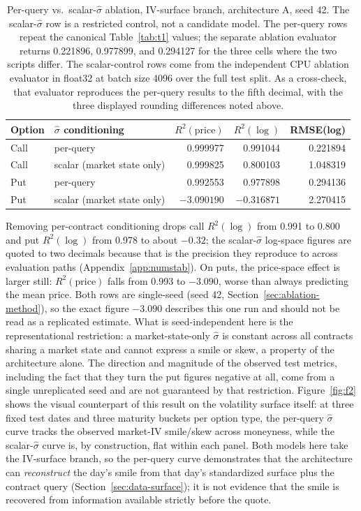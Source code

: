 \documentclass[11pt]{article}
\begin{document}
\begin{table}[t]
\centering
\small
\caption{Per-query vs.\ scalar-$\hat\sigma$ ablation, IV-surface branch, architecture A, seed 42. The
scalar-$\hat\sigma$ row is a restricted control, not a candidate model. The per-query rows repeat the
canonical Table~\ref{tab:t1} values; the separate ablation evaluator returns 0.221896, 0.977899, and
0.294127 for the three cells where the two scripts differ. The scalar-control rows come from the
independent CPU ablation evaluator in float32 at batch size 4096 over the full test split. As a
cross-check, that evaluator reproduces the per-query results to the fifth decimal, with the three
displayed rounding differences noted above.}
\label{tab:ablation}
\begin{tabular}{llrrr}
\toprule
Option & $\hat\sigma$ conditioning & $R^2(\text{price})$ & $R^2(\log)$ & RMSE(log) \\
\midrule
Call & per-query & 0.999977 & 0.991044 & 0.221894 \\
Call & scalar (market state only) & 0.999825 & 0.800103 & 1.048319 \\
Put  & per-query & 0.992553 & 0.977898 & 0.294136 \\
Put  & scalar (market state only) & $-3.090190$ & $-0.316871$ & 2.270415 \\
\bottomrule
\end{tabular}
\end{table}

Removing per-contract conditioning drops call $R^2(\log)$ from 0.991 to 0.800 and put $R^2(\log)$ from
0.978 to about $-0.32$; the scalar-$\hat\sigma$ log-space figures are quoted to two decimals because
that is the precision they reproduce to across evaluation paths (Appendix~\ref{app:numstab}). On puts,
the price-space effect is larger still: $R^2(\text{price})$ falls from
0.993 to $-3.090$, worse than always predicting the mean price. Both rows are single-seed (seed 42,
Section~\ref{sec:ablation-method}), so the exact figure $-3.090$ describes this one run and should not
be read as a replicated estimate. What is seed-independent here is the representational restriction: a
market-state-only $\hat\sigma$ is constant across all contracts sharing a market state and cannot
express a smile or skew, a property of the architecture alone. The direction and magnitude of the
observed test metrics, including the fact that they turn the put figures negative at all, come from a
single unreplicated seed and are not guaranteed by that restriction. Figure~\ref{fig:f2} shows the
visual counterpart of this result on the volatility surface itself: at three fixed test dates and three
maturity buckets per option type, the per-query $\hat\sigma$ curve tracks the observed market-IV
smile/skew across moneyness, while the scalar-$\hat\sigma$ curve is, by construction, flat within each
panel. Both models here take the IV-surface branch, so the per-query curve demonstrates that the
architecture can \emph{reconstruct} the day's smile from that day's standardized surface plus the
contract query (Section~\ref{sec:data-surface}); it is not evidence that the smile is recovered from
information available strictly before the quote.
\end{document}
